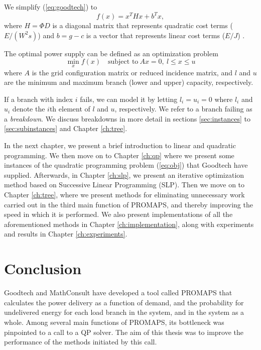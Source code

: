 \documentclass[a4paper,12pt]{report}
\begin{document}
We simplify (\ref{eq:goodtech}) to
\begin{equation}
    f(x) = x^T H x + b^T x, \label{eq:obj}
\end{equation}
where $H = \Phi D$ is a diagonal matrix that represents quadratic cost terms
($E/(W^2 s)$) and $b = g - c$ is a vector that represents linear cost terms
($E/J$) \cite{digernes}.

The optimal power supply can be defined as an optimization problem
\begin{equation}
   \min_{x} f(x)\quad\textrm{subject to}~Ax = 0,
                             ~l \leq x \leq u \label{eq:thesisqp}
\end{equation}
where $A$ is the grid configuration matrix or reduced incidence matrix, and
$l$ and $u$ are the minimum and maximum branch (lower and upper) capacity,
respectively\cite{digernes}.

If a branch with index $i$ fails, we can model it by letting
$l_i = u_i = 0$ where $l_i$ and $u_i$ denote the $i$th element of $l$ and
$u$, respectively. We refer to a branch failing as a \textit{breakdown}.
We discuss breakdowns in more detail in sections \ref{sec:instances} to
\ref{sec:subinstances} and Chapter \ref{ch:tree}.

In the next chapter, we present a brief introduction to linear and quadratic
programming.
We then move on to Chapter \ref{ch:qp} where we present some instances of the
quadratic programming problem (\ref{eq:obj}) that Goodtech have supplied.
Afterwards, in Chapter \ref{ch:slp}, we present
an iterative optimization method based on Successive Linear Programming (SLP).
Then we move on to Chapter \ref{ch:tree}, where we present methods for
eliminating unnecessary work carried out in the third main function of PROMAPS,
and thereby improving the speed in which it is performed.
We also present implementations of all the aforementioned methods in Chapter
\ref{ch:implementation}, along with
experiments and results in Chapter \ref{ch:experiments}.








\chapter{Conclusion}
Goodtech and MathConsult have developed a tool called PROMAPS that calculates
the power delivery as a function of demand, and the probability for undelivered
energy for each load branch in the system, and in the system as a whole.
Among several main functions of PROMAPS, its bottleneck was pinpointed to
a call to a QP solver. The aim of this thesis was to improve the performance
of the methods initiated by this call.
\end{document}
